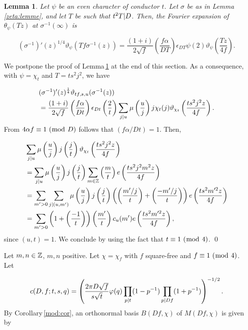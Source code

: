 \documentclass[leqno,10pt]{amsart}
\theoremstyle{plain}
\numberwithin{equation}{section}
\newtheorem{lemme}[thm]{Lemma}
\theoremstyle{definition}
\theoremstyle{remark}
\begin{document}
\begin{lemme}\label{asymp:lemme}
Let $\psi$ be an even character of conductor $t$. Let $\sigma$ be as in Lemma\,\ref{zeta:lemme}, and let $T$ be such that $t^2T \vert D $. Then, the Fourier expansion of $\theta_\psi(Tz)$ at $\sigma^{-1}(\infty)$ is

\begin{equation*}
(\sigma^{-1})'(z)^{1/4} \vartheta_\psi \left(Tf \sigma^{-1}(z)\right)
= \frac{(1+i)}{2\sqrt{f}} \left(\frac{f\alpha}{DT}\right) \epsilon_{DT}\psi(2) \vartheta_\psi \left(\frac{Tz}{4f}\right).
\end{equation*}
\end{lemme}

We postpone the proof of Lemma\,\ref{asymp:lemme} at the end of this section. As a consequence, with $\psi=\chi_t$ and $T=ts^2j^2$, we have 

\begin{align*}
& (\sigma^{-1})'(z)^{\frac{1}{4}} \vartheta_{tf,s,u} (\sigma^{-1}(z))\\
&= \frac{(1+i)}{2\sqrt{f}} \left(\frac{f\alpha}{Dt}\right) \epsilon_{Dt}\left(\frac{2}{t}\right)\sum_{j \vert u} \mu \left(\frac{u}{j}\right) j \chi_t(j) \vartheta_{\chi_t} \left(\frac{ts^2j^2z}{4f}\right).
\end{align*}
From $4\alpha f \equiv 1 \ (\bmod\  D)$ follows that $(f\alpha/Dt)=1$. Then, 

\begin{align*}
&\sum_{j \vert u} \mu \left(\frac{u}{j}\right) j \left(\frac{j}{t}\right) 
 \vartheta_{\chi_t} \left(\frac{ts^2j^2z}{4f}\right)\\
&=\sum_{j \vert u} \mu \left(\frac{u}{j}\right) j \left(\frac{j}{t}\right) 
\sum_{m\in \mathbb{Z}} \left(\frac{m}{t}\right) e\left(\frac{ts^2j^2m^2z}{4f}\right)\\
&= \sum_{m'>0} \sum_{j \vert (u,m')} \mu \left(\frac{u}{j}\right) j \left(\frac{j}{t}\right) 
\left( \left(\frac{m'/j}{t}\right)+\left(\frac{-m'/j}{t}\right)\right) e\left(\frac{ts^2m'^2z}{4f}\right)\\
&=  \sum_{m'>0} \left(1+\left(\frac{-1}{t}\right)\right) \left(\frac{m'}{t}\right)c_u(m') e\left(\frac{ts^2m'^2z}{4f}\right),
\end{align*}
since $(u,t)=1$. We conclude by using the fact that $t\equiv 1 \ (\bmod\  4)$. 
\qed

Let $m,n\in\mathbb{Z}$, $m,n$ positive. Let $\chi=\chi_f$ with $f$ square-free and $f\equiv 1 \ (\bmod\  4)$. 
Let 

\begin{equation*}
c(D,f;t,s,q) 
= \left(\frac{2 \pi D \sqrt{f}}{s\sqrt{t}}\varphi(q) \prod_{p\vert t}(1-p^{-1}) \prod_{p\vert Df}(1+p^{-1})\right)^{-1/2}.  
\end{equation*}
By Corollary\,\ref{mod:cor}, an orthonormal basis $B(Df,\chi)$ of $M(Df,\chi)$ is given by 
\end{document}
